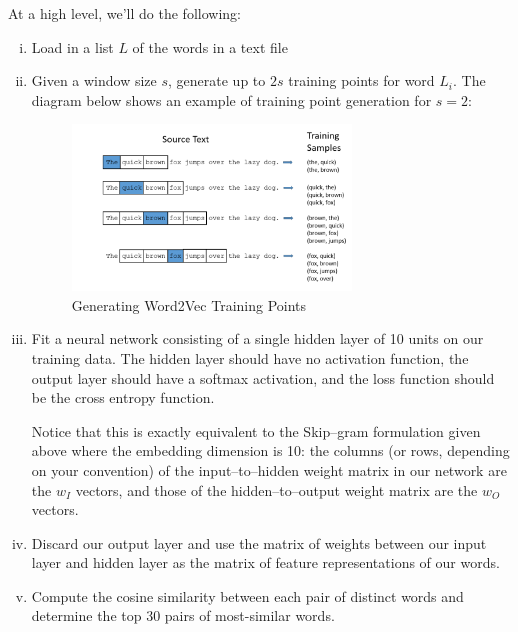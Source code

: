 At a high level, we'll do the following:
\begin{enumerate} [(i)]
\item
Load in a list $L$ of the words in a text file

\item
Given a window size $s$, generate up to $2s$ training points for
word $L_i$. The diagram below shows an example of training point generation for $s = 2$:

\begin{figure}[H]
	\begin{center}
	\includegraphics[width=0.7\textwidth]{training_data_example.png}
	\caption{Generating Word2Vec Training Points}
	\end{center}
\end{figure}


\item
Fit a neural network consisting of a single hidden layer of 10 units on our training data.  The hidden layer should have no activation function, the output layer should have a softmax activation, and the loss function should be the cross entropy function.  

Notice that this is exactly equivalent to the Skip--gram formulation given above where the embedding dimension is 10: the columns (or rows, depending on your convention) of the input--to--hidden weight matrix in our network are the $w_I$ vectors, and those of the hidden--to--output weight matrix are the $w_O$ vectors.

\item
Discard our output layer and use the matrix of weights between our input layer and hidden layer as the matrix of feature representations of our words.

\item
Compute the cosine similarity between each pair of distinct words and determine the top 30 pairs of most-similar words.
\end{enumerate}

